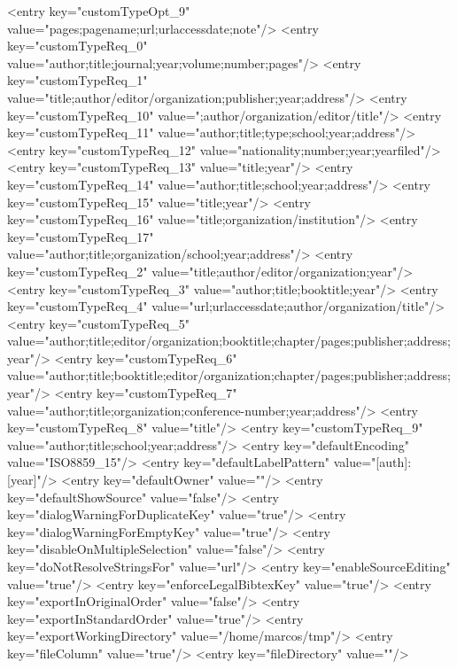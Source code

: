 \begin{codigo}[caption={Código de configuração do programa JabRef em XML}, label={codigo:config-jabref}, language=XML, breaklines=true]
            <entry key="customTypeOpt_9" value="pages;pagename;url;urlaccessdate;note"/>
            <entry key="customTypeReq_0" value="author;title;journal;year;volume;number;pages"/>
            <entry key="customTypeReq_1" value="title;author/editor/organization;publisher;year;address"/>
            <entry key="customTypeReq_10" value=";author/organization/editor/title"/>
            <entry key="customTypeReq_11" value="author;title;type;school;year;address"/>
            <entry key="customTypeReq_12" value="nationality;number;year;yearfiled"/>
            <entry key="customTypeReq_13" value="title;year"/>
            <entry key="customTypeReq_14" value="author;title;school;year;address"/>
            <entry key="customTypeReq_15" value="title;year"/>
            <entry key="customTypeReq_16" value="title;organization/institution"/>
            <entry key="customTypeReq_17" value="author;title;organization/school;year;address"/>
            <entry key="customTypeReq_2" value="title;author/editor/organization;year"/>
            <entry key="customTypeReq_3" value="author;title;booktitle;year"/>
            <entry key="customTypeReq_4" value="url;urlaccessdate;author/organization/title"/>
            <entry key="customTypeReq_5" value="author;title;editor/organization;booktitle;chapter/pages;publisher;address;year"/>
            <entry key="customTypeReq_6" value="author;title;booktitle;editor/organization;chapter/pages;publisher;address;year"/>
            <entry key="customTypeReq_7" value="author;title;organization;conference-number;year;address"/>
            <entry key="customTypeReq_8" value="title"/>
            <entry key="customTypeReq_9" value="author;title;school;year;address"/>
            <entry key="defaultEncoding" value="ISO8859_15"/>
            <entry key="defaultLabelPattern" value="[auth]:[year]"/>
            <entry key="defaultOwner" value=""/>
            <entry key="defaultShowSource" value="false"/>
            <entry key="dialogWarningForDuplicateKey" value="true"/>
            <entry key="dialogWarningForEmptyKey" value="true"/>
            <entry key="disableOnMultipleSelection" value="false"/>
            <entry key="doNotResolveStringsFor" value="url"/>
            <entry key="enableSourceEditing" value="true"/>
            <entry key="enforceLegalBibtexKey" value="true"/>
            <entry key="exportInOriginalOrder" value="false"/>
            <entry key="exportInStandardOrder" value="true"/>
            <entry key="exportWorkingDirectory" value="/home/marcos/tmp"/>
            <entry key="fileColumn" value="true"/>
            <entry key="fileDirectory" value=""/>

\end{codigo}
